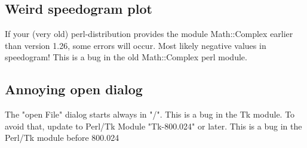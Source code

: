 

\subsection*{Weird speedogram plot}
If your (very old) perl-distribution provides the module Math::Complex earlier
than version 1.26, some errors will occur. Most likely negative values in
speedogram! This is a bug in the old Math::Complex perl module.


\subsection*{Annoying open dialog}
The "open File" dialog starts always in "/". This is  a bug in the
Tk module. To avoid that, update to Perl/Tk Module "Tk-800.024" or later.
This is a bug in the Perl/Tk module before 800.024







